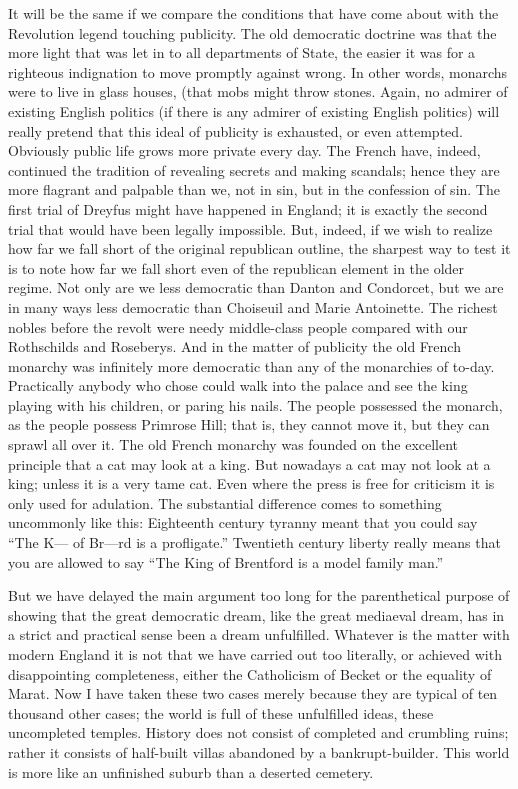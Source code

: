 \documentclass{book}
\begin{document}
It will be the same if we compare the conditions that have come about with the Revolution legend touching publicity. The old democratic doctrine was that the more light that was let in to all departments of State, the easier it was for a righteous indignation to move promptly against wrong. In other words, monarchs were to live in glass houses, (that mobs might throw stones. Again, no admirer of existing English politics (if there is any admirer of existing English politics) will really pretend that this ideal of publicity is exhausted, or even attempted. Obviously public life grows more private every day. The French have, indeed, continued the tradition of revealing secrets and making scandals; hence they are more flagrant and palpable than we, not in sin, but in the confession of sin. The first trial of Dreyfus might have happened in England; it is exactly the second trial that would have been legally impossible. But, indeed, if we wish to realize how far we fall short of the original republican outline, the sharpest way to test it is to note how far we fall short even of the republican element in the older regime. Not only are we less democratic than Danton and Condorcet, but we are in many ways less democratic than Choiseuil and Marie Antoinette. The richest nobles before the revolt were needy middle-class people compared with our Rothschilds and Roseberys. And in the matter of publicity the old French monarchy was infinitely more democratic than any of the monarchies of to-day. Practically anybody who chose could walk into the palace and see the king playing with his children, or paring his nails. The people possessed the monarch, as the people possess Primrose Hill; that is, they cannot move it, but they can sprawl all over it. The old French monarchy was founded on the excellent principle that a cat may look at a king. But nowadays a cat may not look at a king; unless it is a very tame cat. Even where the press is free for criticism it is only used for adulation. The substantial difference comes to something uncommonly like this: Eighteenth century tyranny meant that you could say “The K— of Br—rd is a profligate.” Twentieth century liberty really means that you are allowed to say “The King of Brentford is a model family man.”

But we have delayed the main argument too long for the parenthetical purpose of showing that the great democratic dream, like the great mediaeval dream, has in a strict and practical sense been a dream unfulfilled. Whatever is the matter with modern England it is not that we have carried out too literally, or achieved with disappointing completeness, either the Catholicism of Becket or the equality of Marat. Now I have taken these two cases merely because they are typical of ten thousand other cases; the world is full of these unfulfilled ideas, these uncompleted temples. History does not consist of completed and crumbling ruins; rather it consists of half-built villas abandoned by a bankrupt-builder. This world is more like an unfinished suburb than a deserted cemetery.
\end{document}
